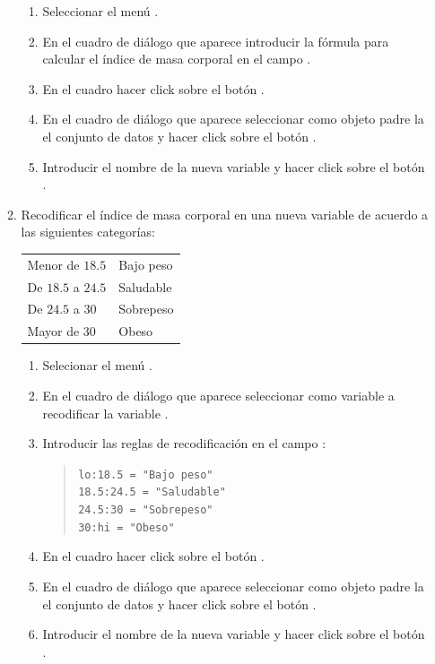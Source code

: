\begin{enumerate}[leftmargin=*]
\begin{enumerate}
\begin{indicacion}{
\begin{enumerate}
\item Seleccionar el menú .
\item En el cuadro de diálogo que aparece introducir la fórmula para calcular el índice de masa
corporal en el campo .
\item En el cuadro  hacer click sobre el botón .
\item En el cuadro de diálogo que aparece seleccionar como objeto padre la el conjunto de datos  y hacer click sobre el botón .
\item Introducir el nombre de la nueva variable  y hacer click sobre el botón .
\end{enumerate} 
}
\end{indicacion}

\item Recodificar el índice de masa corporal en una nueva variable de acuerdo a las siguientes categorías:
\begin{center}
\begin{tabular}{ll}
Menor de $18.5$ & Bajo peso\\
De $18.5$ a $24.5$ & Saludable\\
De $24.5$ a $30$ & Sobrepeso\\
Mayor de $30$  & Obeso
\end{tabular}
\end{center}

\begin{indicacion}{
\begin{enumerate}
\item Selecionar el menú .
\item En el cuadro de diálogo que aparece seleccionar como variable a recodificar la variable .
\item Introducir las reglas de recodificación en el campo :
\begin{quote}
\lstinline{lo:18.5 = "Bajo peso"}\\
\lstinline{18.5:24.5 = "Saludable"}\\
\lstinline{24.5:30 = "Sobrepeso"}\\
\lstinline{30:hi = "Obeso"}
\end{quote}
\item En el cuadro  hacer click sobre el botón .
\item En el cuadro de diálogo que aparece seleccionar como objeto padre la el conjunto de datos  y hacer click sobre el botón .
\item Introducir el nombre de la nueva variable  y hacer click sobre el botón .
\end{enumerate}
}
\end{indicacion}



\end{enumerate}
\end{enumerate}
